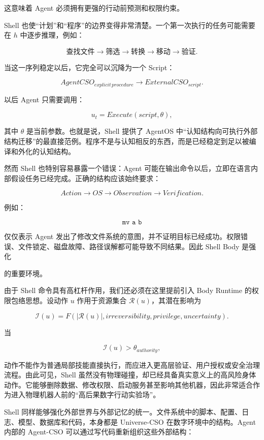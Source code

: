 这意味着 Agent 必须拥有更强的行动前预测和权限约束。

Shell 也使“计划”和“程序”的边界变得非常清楚。一个第一次执行的任务可能需要在 $h$ 中逐步推理，例如：

$$
\text{查找文件}
\rightarrow
\text{筛选}
\rightarrow
\text{转换}
\rightarrow
\text{移动}
\rightarrow
\text{验证}.
$$

当这一序列稳定以后，它完全可以沉降为一个 Script：

$$
AgentCSO_{explicit\,procedure}
\rightarrow
ExternalCSO_{script}.
$$

以后 Agent 只需要调用：

$$
u_t=Execute(script,\theta),
$$

其中 $\theta$ 是当前参数。也就是说，Shell 提供了 AgentOS 中“认知结构向可执行外部结构迁移”的最直接范例。程序不是与认知相反的东西，而是已经稳定到足以被编译和外化的认知结构。

然而 Shell 也特别容易暴露一个错误：Agent 可能在输出命令以后，立即在语言内部假设任务已经完成。正确的结构应该始终要求：

$$
Action
\rightarrow
OS
\rightarrow
Observation
\rightarrow
Verification.
$$

例如：

$$
\texttt{mv a b}
$$

仅仅表示 Agent 发出了修改文件系统的意图，并不证明目标已经成功。权限错误、文件锁定、磁盘故障、路径误解都可能导致不同结果。因此 Shell Body 是强化

\begin{statementbox}
\centering
{}
\end{statementbox}

的重要环境。

由于 Shell 命令具有高杠杆作用，我们还必须在这里提前引入 Body Runtime 的权限包络思想。设动作 $u$ 作用于资源集合 $\mathcal R(u)$，其潜在影响为

$$
\mathcal I(u)
=
F(
|\mathcal R(u)|,
irreversibility,
privilege,
uncertainty
).
$$

当

$$
\mathcal I(u)>\theta_{authority},
$$

动作不能作为普通局部技能直接执行，而应进入更高层验证、用户授权或安全治理流程。由此可见，Shell 虽然没有物理碰撞，却已经具备真实意义上的高风险身体动作。它能够删除数据、修改权限、启动服务甚至影响其他机器，因此非常适合作为进入物理机器人前的“高后果数字行动实验场”。

Shell 同样能够强化外部世界与外部记忆的统一。文件系统中的脚本、配置、日志、模型、数据库和代码，本身都是 Universe-CSO 在数字环境中的结构。Agent 内部的 Agent-CSO 可以通过写代码重新组织这些外部结构：


